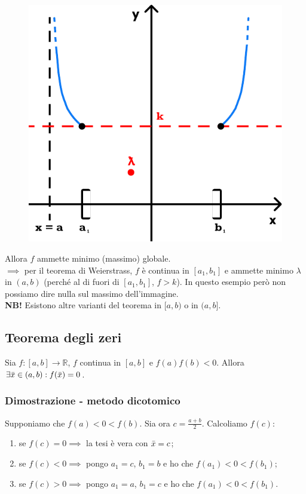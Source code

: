 \documentclass{article}
\begin{document}
\begin{figure}
\includegraphics[width=0.9\linewidth]{./images/weierstrassThm.pdf}
\end{figure}

\noindent Allora $f$ ammette minimo (massimo) globale. \\

\noindent $\implies$ per il teorema di Weierstrass, $f$ è continua in $[a_1, b_1]$ e ammette minimo $\lambda$ in $(a, b)$ (perché al di fuori di $[a_1, b_1]$, $f > k$). In questo esempio però non possiamo dire nulla sul massimo dell'immagine.\\

\noindent\textbf{NB!} Esistono altre varianti del teorema in $[a, b)$ o in $(a, b]$.

\subsection{Teorema degli zeri}
Sia $f: [a, b] \xrightarrow{} \mathbb{R}$, $f$ continua in $[a, b]$ e $f(a)f(b) < 0$. Allora $\exists \Bar{x} \in (a, b) : f(\Bar{x}) = 0$.

\subsubsection{Dimostrazione - metodo dicotomico}
Supponiamo che $f(a) < 0 < f(b)$. Sia ora $c = \frac{a + b}{2}$. Calcoliamo $f(c)$:
\begin{enumerate}
  \item se $f(c) = 0 \implies$ la tesi è vera con $\Bar{x} = c$;
  \item se $f(c) < 0 \implies$ pongo $a_1 = c$, $b_1 = b$ e ho che $f(a_1) < 0 < f(b_1)$;
  \item se $f(c) > 0 \implies$ pongo $a_1 = a$, $b_1 = c$ e ho che $f(a_1) < 0 < f(b_1)$.
\end{enumerate}
\end{document}
